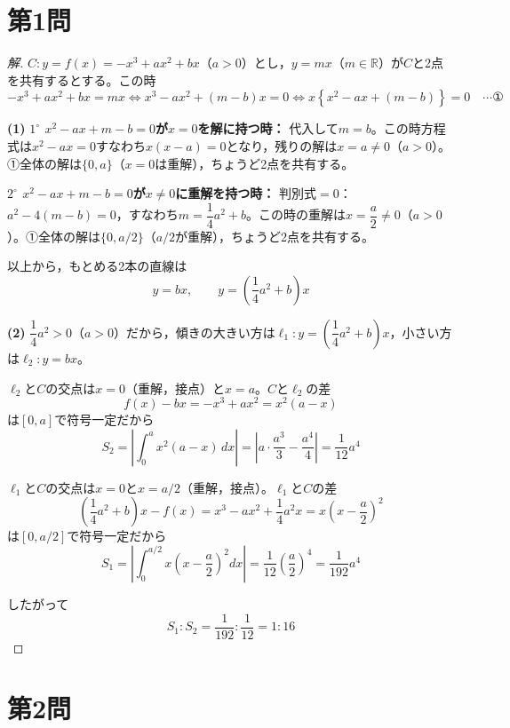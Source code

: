 \documentclass[../main.tex]{subfiles}
\begin{document}
\section*{第1問}

\begin{proof}[解]
  $C:y=f(x)=-x^3+ax^2+bx$（$a>0$）とし，$y=mx$（$m\in\mathbb R$）が$C$と2点を共有するとする。この時
  \[
    -x^3+ax^2+bx=mx \iff x^3-ax^2+(m-b)x=0 \iff x\left\{x^2-ax+(m-b)\right\}=0 \quad\cdots\text{①}
  \]

  \textbf{(1)} \textbf{$1^\circ$ $x^2-ax+m-b=0$が$x=0$を解に持つ時：} 代入して$m=b$。この時方程式は$x^2-ax=0$すなわち$x(x-a)=0$となり，残りの解は$x=a\ne0$（$a>0$）。①全体の解は$\{0,a\}$（$x=0$は重解），ちょうど2点を共有する。

  \textbf{$2^\circ$ $x^2-ax+m-b=0$が$x\ne0$に重解を持つ時：} 判別式$=0$：$a^2-4(m-b)=0$，すなわち$m=\dfrac14a^2+b$。この時の重解は$x=\dfrac a2\ne0$（$a>0$）。①全体の解は$\{0,a/2\}$（$a/2$が重解），ちょうど2点を共有する。

  以上から，もとめる2本の直線は
  \[
    y=bx,\qquad y=\left(\frac14a^2+b\right)x
  \]

  \textbf{(2)} $\dfrac14a^2>0$（$a>0$）だから，傾きの大きい方は$\ell_1:y=\left(\dfrac14a^2+b\right)x$，小さい方は$\ell_2:y=bx$。

  $\ell_2$と$C$の交点は$x=0$（重解，接点）と$x=a$。$C$と$\ell_2$の差
  \[
    f(x)-bx=-x^3+ax^2=x^2(a-x)
  \]
  は$[0,a]$で符号一定だから
  \[
    S_2=\left|\int_0^a x^2(a-x)\,dx\right|=\left|a\cdot\frac{a^3}3-\frac{a^4}4\right|=\frac1{12}a^4
  \]

  $\ell_1$と$C$の交点は$x=0$と$x=a/2$（重解，接点）。$\ell_1$と$C$の差
  \[
    \left(\frac14a^2+b\right)x-f(x)=x^3-ax^2+\frac14a^2x=x\left(x-\frac a2\right)^2
  \]
  は$[0,a/2]$で符号一定だから
  \[
    S_1=\left|\int_0^{a/2}x\left(x-\frac a2\right)^2dx\right|=\frac1{12}\left(\frac a2\right)^4=\frac1{192}a^4
  \]

  したがって
  \[
    S_1:S_2=\frac1{192}:\frac1{12}=1:16
  \]
\end{proof}

\newpage

\section*{第2問}
\end{document}
